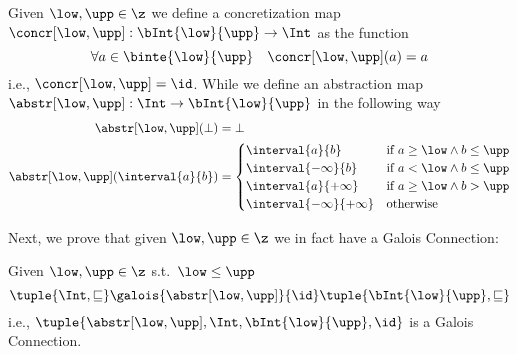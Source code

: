 \begin{definition}\label{def:abstrcons}
  Given \(\low, \upp\in\z\) we define a concretization map
  \(\concr[\low,\upp] : \bInt{\low}{\upp} \to \Int\) as the function
  \begin{equation*}
    \forall a \in \binte{\low}{\upp} \quad \concr[\low,\upp](a) = a
  \end{equation*}
  i.e., \(\concr[\low,\upp] = \id\). While we define an abstraction map
  \(\abstr[\low, \upp] : \Int \to \bInt{\low}{\upp}\) in the following way
  \begin{align*}
    \abstr[\low,\upp](\bot) & = \bot \\
    \abstr[\low,\upp](\interval{a}{b}) & =
                                       \begin{cases}
                                         \interval{a}{b} & \text{if } a \geq \low \wedge b \leq \upp \\
                                         \interval{-\infty}{b} & \text{if } a < \low \wedge b \leq \upp \\
                                         \interval{a}{+\infty} & \text{if } a \geq \low \wedge b > \upp \\
                                         \interval{-\infty}{+\infty} & \text{otherwise}
                                       \end{cases}
  \end{align*}
\end{definition}

Next, we prove that given \(\low, \upp\in\z\) we in fact have a Galois
Connection:

\begin{lemma}
  Given \(\low, \upp \in \z\) s.t.~\({\low \leq \upp}\)
  \begin{equation*}
    \tuple{\Int, \sqsubseteq} \galois{\abstr[\low, \upp]}{\id} \tuple{\bInt{\low}{\upp}, \sqsubseteq}
  \end{equation*}
  i.e., \(\tuple{\abstr[\low, \upp], \Int, \bInt{\low}{\upp}, \id}\) is
  a Galois Connection.
\end{lemma}

